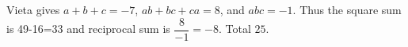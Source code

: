 Vieta gives $a+b+c=-7$, $ab+bc+ca=8$, and $abc=-1$. Thus the square sum is 49-16=33 and reciprocal sum is $\dfrac{8}{-1}=-8$. Total $\boxed{25}$.
